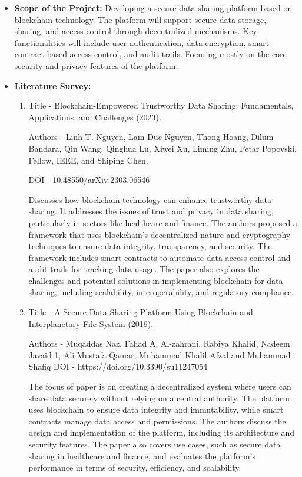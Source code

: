 \documentclass[12pt]{report}	%
\begin{document}
{{\begin{itemize}
\item{\textbf{Scope of the Project:}}
\newline
Developing a secure data sharing platform based on blockchain technology. The platform will support secure data storage, sharing, and access control through decentralized mechanisms. Key functionalities will include user authentication, data encryption, smart contract-based access control, and audit trails. Focusing mostly on the core security and privacy features of the platform.


\item{\textbf{Literature Survey:}}
\newline
\begin{enumerate}
\item{Title - Blockchain-Empowered Trustworthy Data Sharing:
Fundamentals, Applications, and Challenges (2023).}

Authors - Linh T. Nguyen, Lam Duc Nguyen, Thong Hoang, Dilum Bandara,
Qin Wang,  Qinghua Lu, Xiwei Xu, Liming Zhu, Petar Popovski, Fellow, IEEE, and Shiping Chen.

DOI - 10.48550/arXiv.2303.06546

Discusses how blockchain technology can enhance trustworthy data sharing. It addresses the issues of trust and privacy in data sharing, particularly in sectors like healthcare and finance. The authors proposed a framework that uses blockchain's decentralized nature and cryptography techniques to ensure data integrity, transparency, and security. The framework includes smart contracts to automate data access control and audit trails for tracking data usage. The paper also explores the challenges and potential solutions in implementing blockchain for data sharing, including scalability, interoperability, and regulatory compliance.

\item{Title - A Secure Data Sharing Platform Using Blockchain
and Interplanetary File System (2019).}

Authors - Muqaddas Naz, Fahad A. Al-zahrani, Rabiya Khalid, Nadeem Javaid 1, Ali Mustafa Qamar, Muhammad Khalil Afzal and Muhammad Shafiq
\newline
DOI - https://doi.org/10.3390/su11247054

The focus of paper is on creating a decentralized system where users can share data securely without relying on a central authority. The platform uses blockchain to ensure data integrity and immutability, while smart contracts manage data access and permissions. The authors discuss the design and implementation of the platform, including its architecture and security features. The paper also covers use cases, such as secure data sharing in healthcare and finance, and evaluates the platform's performance in terms of security, efficiency, and scalability.


\end{enumerate}
\end{itemize}}}
\end{document}
